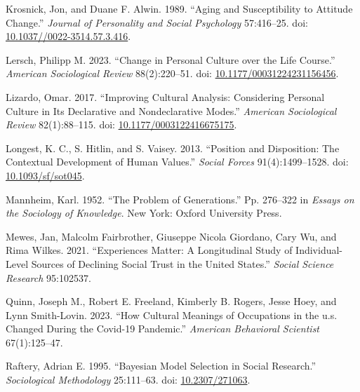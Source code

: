 \documentclass[
  12pt,
]{article}
\newlength{\cslhangindent}
\newlength{\cslentryspacingunit} %
\newenvironment{CSLReferences}[2] %
 {%
  \setlength{\parindent}{0pt}
  \ifodd #1
  \let\oldpar\par
  \def\par{\hangindent=\cslhangindent\oldpar}
  \fi
  \setlength{\parskip}{#2\cslentryspacingunit}
 }%
 {}
\begin{document}
\begin{CSLReferences}{1}{0}
\leavevmode{}%
Krosnick, Jon, and Duane F. Alwin. 1989. {``Aging and {Susceptibility}
to {Attitude} {Change}.''} \emph{Journal of Personality and Social
Psychology} 57:416--25. doi:
\href{https://doi.org/10.1037//0022-3514.57.3.416}{10.1037//0022-3514.57.3.416}.

\leavevmode{}%
Lersch, Philipp M. 2023. {``Change in {Personal} {Culture} over the
{Life} {Course}.''} \emph{American Sociological Review} 88(2):220--51.
doi:
\href{https://doi.org/10.1177/00031224231156456}{10.1177/00031224231156456}.

\leavevmode{}%
Lizardo, Omar. 2017. {``Improving {Cultural} {Analysis}: {Considering}
{Personal} {Culture} in Its {Declarative} and {Nondeclarative}
{Modes}.''} \emph{American Sociological Review} 82(1):88--115. doi:
\href{https://doi.org/10.1177/0003122416675175}{10.1177/0003122416675175}.

\leavevmode{}%
Longest, K. C., S. Hitlin, and S. Vaisey. 2013. {``Position and
{Disposition}: {The} {Contextual} {Development} of {Human} {Values}.''}
\emph{Social Forces} 91(4):1499--1528. doi:
\href{https://doi.org/10.1093/sf/sot045}{10.1093/sf/sot045}.

\leavevmode{}%
Mannheim, Karl. 1952. {``The {Problem} of {Generations}.''} Pp. 276--322
in \emph{Essays on the {Sociology} of {Knowledge}}. New York: Oxford
University Press.

\leavevmode{}%
Mewes, Jan, Malcolm Fairbrother, Giuseppe Nicola Giordano, Cary Wu, and
Rima Wilkes. 2021. {``Experiences Matter: A Longitudinal Study of
Individual-Level Sources of Declining Social Trust in the United
States.''} \emph{Social Science Research} 95:102537.

\leavevmode{}%
Quinn, Joseph M., Robert E. Freeland, Kimberly B. Rogers, Jesse Hoey,
and Lynn Smith-Lovin. 2023. {``How Cultural Meanings of Occupations in
the u.s. Changed During the Covid-19 Pandemic.''} \emph{American
Behavioral Scientist} 67(1):125--47.

\leavevmode{}%
Raftery, Adrian E. 1995. {``Bayesian {Model} {Selection} in {Social}
{Research}.''} \emph{Sociological Methodology} 25:111--63. doi:
\href{https://doi.org/10.2307/271063}{10.2307/271063}.


\end{CSLReferences}
\end{document}
